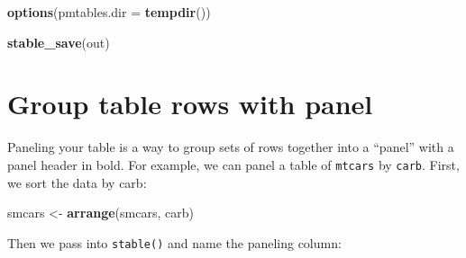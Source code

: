 \documentclass[
]{book}
\newenvironment{Shaded}{\begin{snugshade}}{\end{snugshade}}
\newcommand{\DataTypeTok}[1]{\textcolor[rgb]{0.13,0.29,0.53}{#1}}
\newcommand{\KeywordTok}[1]{\textcolor[rgb]{0.13,0.29,0.53}{\textbf{#1}}}
\newcommand{\NormalTok}[1]{#1}
\newcommand{\OperatorTok}[1]{\textcolor[rgb]{0.81,0.36,0.00}{\textbf{#1}}}
\newcommand{\StringTok}[1]{\textcolor[rgb]{0.31,0.60,0.02}{#1}}
\begin{document}
\begin{Shaded}
\begin{Highlighting}[]
\KeywordTok{options}\NormalTok{(}\DataTypeTok{pmtables.dir =} \KeywordTok{tempdir}\NormalTok{())}

\KeywordTok{stable_save}\NormalTok{(out)}
\end{Highlighting}
\end{Shaded}

\hypertarget{panel-intro}{%
\chapter{Group table rows with panel}\label{panel-intro}}

Paneling your table is a way to group sets of rows together into a ``panel''
with a panel header in bold. For example, we can panel a table of \texttt{mtcars} by \texttt{carb}. First, we sort
the data by carb:

\begin{Shaded}
\begin{Highlighting}[]
\NormalTok{smcars <-}\StringTok{ }\KeywordTok{arrange}\NormalTok{(smcars, carb)}
\end{Highlighting}
\end{Shaded}

Then we pass into \texttt{stable()} and name the paneling column:

\begin{Shaded}
\end{Shaded}
\end{document}
